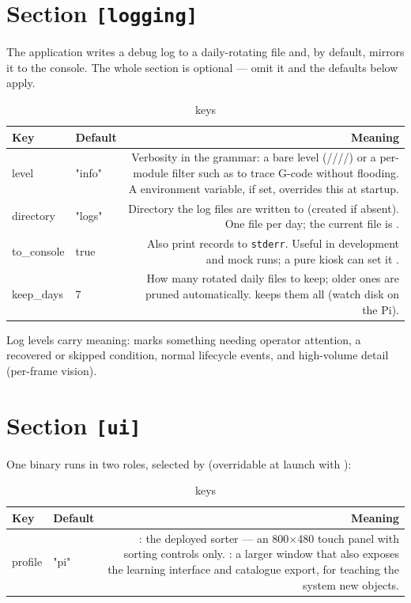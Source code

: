 \section{Section \texttt{[logging]}}
%
The application writes a debug log to a daily-rotating file and, by default,
mirrors it to the console. The whole section is optional --- omit it and the
defaults below apply.
\begin{table}[h]
  \centering
  \begin{tabularx}{\textwidth}{KTD}
    \toprule
    \textbf{Key} & \textbf{Default} & \textbf{Meaning} \\
    \midrule
    level & "info" & Verbosity in the  grammar: a bare level
      (////) or a
      per-module filter such as  to trace G-code
      without flooding. A  environment variable, if set,
      overrides this at startup. \\
    directory & "logs" & Directory the log files are written to (created if
      absent). One file per day; the current file is
      . \\
    to\_console & true & Also print records to \texttt{stderr}. Useful in
      development and mock runs; a pure kiosk can set it . \\
    keep\_days & 7 & How many rotated daily files to keep; older ones are
      pruned automatically.  keeps them all (watch disk on the Pi). \\
    \bottomrule
  \end{tabularx}
  \caption{\cfg{[logging]} keys}
\end{table}

Log levels carry meaning:  marks something needing operator
attention,  a recovered or skipped condition,  normal
lifecycle events, and  high-volume detail (per-frame vision).

\section{Section \texttt{[ui]}}
%
One binary runs in two roles, selected by  (overridable at
launch with ):
\begin{table}[h]
  \centering
  \begin{tabularx}{\textwidth}{KTD}
    \toprule
    \textbf{Key} & \textbf{Default} & \textbf{Meaning} \\
    \midrule
    profile & "pi" & : the deployed sorter --- an 800$\times$480
      touch panel with sorting controls only. : a larger
      window that also exposes the learning interface and catalogue export,
      for teaching the system new objects. \\
    \bottomrule
  \end{tabularx}
  \caption{\cfg{[ui]} keys}
\end{table}

